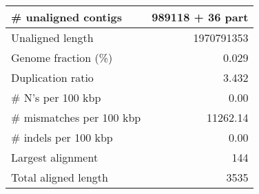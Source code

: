 \documentclass[12pt,a4paper]{article}
\begin{document}
\begin{table}[ht]
\begin{center}
\begin{tabular}{|l*{1}{|r}|}
\# unaligned contigs & 989118 + 36 part \\ \hline
Unaligned length & 1970791353 \\ \hline
Genome fraction (\%) & 0.029 \\ \hline
Duplication ratio & 3.432 \\ \hline
\# N's per 100 kbp & 0.00 \\ \hline
\# mismatches per 100 kbp & 11262.14 \\ \hline
\# indels per 100 kbp & 0.00 \\ \hline
Largest alignment & 144 \\ \hline
Total aligned length & 3535 \\ \hline
\end{tabular}
\end{center}
\end{table}
\end{document}
